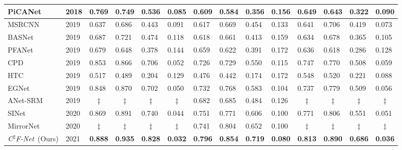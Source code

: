 \documentclass{article}
\def\OurModel{\textit{C$^2$F-Net}} %
\begin{document}
\begin{table*}[ht]
\begin{tabular}{l|l|llll|llll|llll}
PiCANet & 2018 & 0.769 & 0.749 & 0.536 & 0.085 & 0.609 & 0.584 & 0.356 & 0.156 & 0.649 & 0.643 & 0.322 & 0.090 \\ \midrule
MSRCNN & 2019 & 0.637 & 0.686 & 0.443 & 0.091 & 0.617 & 0.669 & 0.454 & 0.133 & 0.641 & 0.706 & 0.419 & 0.073 \\ 
BASNet & 2019 & 0.687 & 0.721 & 0.474 & 0.118 & 0.618 & 0.661 & 0.413 & 0.159 & 0.634 & 0.678 & 0.365 & 0.105 \\ 
PFANet & 2019 & 0.679 & 0.648 & 0.378 & 0.144 & 0.659 & 0.622 & 0.391 & 0.172 & 0.636 & 0.618 & 0.286 & 0.128 \\ 
CPD & 2019 & 0.853 & 0.866 & 0.706 & 0.052 & 0.726 & 0.729 & 0.550 & 0.115 & 0.747 & 0.770 & 0.508 & 0.059 \\ 
HTC & 2019 & 0.517 & 0.489 & 0.204 & 0.129 & 0.476 & 0.442 & 0.174 & 0.172 & 0.548 & 0.520 & 0.221 & 0.088 \\ 
EGNet & 2019 & 0.848 & 0.870 & 0.702 & 0.050 & 0.732 & 0.768 & 0.583 & 0.104 & 0.737 & 0.779 & 0.509 & 0.056 \\ 
ANet-SRM & 2019 & \multicolumn{1}{c}{‡} & \multicolumn{1}{c}{‡} & \multicolumn{1}{c}{‡} & \multicolumn{1}{c|}{‡} & 0.682 & 0.685 & 0.484 & 0.126 & \multicolumn{1}{c}{‡} & \multicolumn{1}{c}{‡} & \multicolumn{1}{c}{‡} & \multicolumn{1}{c}{‡} \\ \midrule
SINet & 2020 & 0.869 & 0.891 & 0.740 & 0.044 & 0.751 & 0.771 & 0.606 & 0.100 & 0.771 & 0.806 & 0.551 & 0.051 \\ 
MirrorNet & 2020 & \multicolumn{1}{c}{‡} & \multicolumn{1}{c}{‡} & \multicolumn{1}{c}{‡} & \multicolumn{1}{c|}{‡} & 0.741 & 0.804 & 0.652 & 0.100 & \multicolumn{1}{c}{‡} & \multicolumn{1}{c}{‡} & \multicolumn{1}{c}{‡} & \multicolumn{1}{c}{‡} \\ 
\OurModel~(Ours) & 2021 & \textbf{0.888} & \textbf{0.935} & \textbf{0.828} & \textbf{0.032} & \textbf{0.796} & \textbf{0.854} & \textbf{0.719} & \textbf{0.080} & \textbf{0.813} & \textbf{0.890} & \textbf{0.686} & \textbf{0.036} \\ 
\bottomrule
\hline
\end{tabular}
\label{tab1}
\end{table*}
\end{document}
